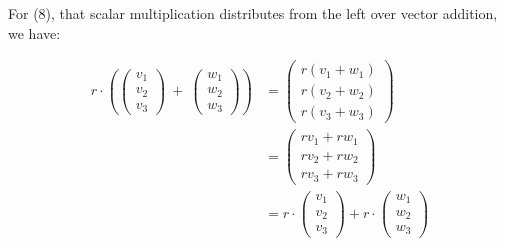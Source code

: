 
For (8), that scalar multiplication distributes from the left over vector addition, we have:

\begin{align*}
r \cdot \left(\left(\begin{array}{c}v_1\\v_2\\v_3\end{array}\right) ~+~\left(\begin{array}{c}w_1\\w_2\\w_3\end{array}\right) \right) &= \left(\begin{array}{c}r(v_1+w_1)\\r(v_2+w_2)\\r(v_3+w_3)\end{array}\right)\\
 &= \left(\begin{array}{c}rv_1+rw_1\\rv_2+rw_2\\rv_3+rw_3\end{array}\right)\\
& = r \cdot\left(\begin{array}{c}v_1\\v_2\\v_3\end{array}\right) + r \cdot\left(\begin{array}{c}w_1\\w_2\\w_3\end{array}\right)
\end{align*}

